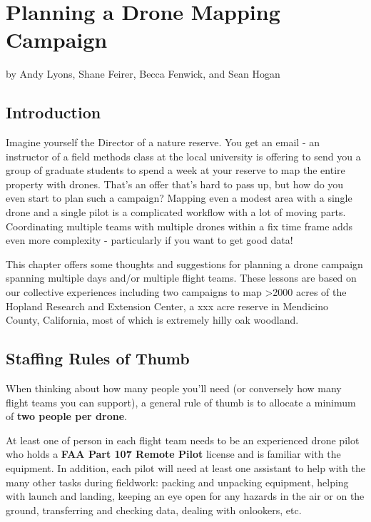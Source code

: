\documentclass[
]{book}
\begin{document}
\hypertarget{planning-a-drone-mapping-campaign}{%
\chapter{Planning a Drone Mapping Campaign}\label{planning-a-drone-mapping-campaign}}

by Andy Lyons, Shane Feirer, Becca Fenwick, and Sean Hogan

\hypertarget{introduction}{%
\section{Introduction}\label{introduction}}

Imagine yourself the Director of a nature reserve. You get an email - an instructor of a field methods class at the local university is offering to send you a group of graduate students to spend a week at your reserve to map the entire property with drones. That's an offer that's hard to pass up, but how do you even start to plan such a campaign? Mapping even a modest area with a single drone and a single pilot is a complicated workflow with a lot of moving parts. Coordinating multiple teams with multiple drones within a fix time frame adds even more complexity - particularly if you want to get good data!

This chapter offers some thoughts and suggestions for planning a drone campaign spanning multiple days and/or multiple flight teams. These lessons are based on our collective experiences including two campaigns to map \textgreater2000 acres of the Hopland Research and Extension Center, a xxx acre reserve in Mendicino County, California, most of which is extremely hilly oak woodland.

\hypertarget{staffing-rules-of-thumb}{%
\section{Staffing Rules of Thumb}\label{staffing-rules-of-thumb}}

When thinking about how many people you'll need (or conversely how many flight teams you can support), a general rule of thumb is to allocate a minimum of \textbf{two people per drone}.

At least one of person in each flight team needs to be an experienced drone pilot who holds a \textbf{FAA Part 107 Remote Pilot} license and is familiar with the equipment. In addition, each pilot will need at least one assistant to help with the many other tasks during fieldwork: packing and unpacking equipment, helping with launch and landing, keeping an eye open for any hazards in the air or on the ground, transferring and checking data, dealing with onlookers, etc.
\end{document}
